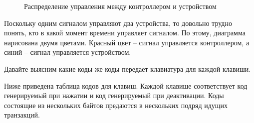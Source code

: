 \begin{figure}[H]
	\centering
	\def\svgwidth{10cm}
	
	\caption{Распределение управления между контроллером и устройством}
\end{figure}

\par{Поскольку одним сигналом управляют два устройства, то довольно трудно понять, кто в какой момент времени управляет сигналом. По этому, диаграмма нарисована двумя цветами. Красный цвет – сигнал управляется контроллером, а синий – сигнал управляется устройством.}

\vspace{4mm}

\par{Давайте выясним какие коды же коды передает клавиатура для каждой клавиши.}

\par{Ниже приведена таблица кодов для клавиш. Каждой клавише соответствует код генерируемый при нажатии и код генерируемый при деактивации. Коды состоящие из нескольких байтов предаются в нескольких подряд идущих транзакций.}

\vspace{4mm}


